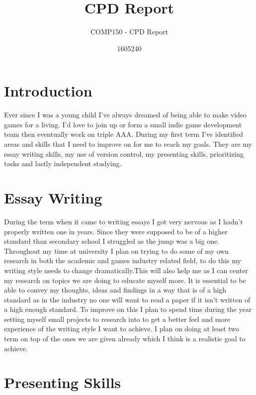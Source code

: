 \documentclass{scrartcl}
\title{CPD Report}
\subtitle{COMP150 - CPD Report}
\author{1605240}
\begin{document}
\maketitle

\section*{Introduction}
Ever since I was a young child I've always dreamed of being able to make video games for a living. I'd love to join up or form a small indie game development team then eventually work on triple AAA. During my first term I've identified areas and skills that I need to improve on for me to reach my goals. They are my essay writing skills, my use of version control, my presenting skills, prioritizing tasks and lastly independent studying.

\section{Essay Writing}
During the term when it came to writing essays I got very nervous as I hadn't properly written one in years. Since they were supposed to be of a higher standard than secondary school I struggled as the jump was a big one. Throughout my time at university I plan on trying to do some of my own research in both the academic and games industry related field, to do this my writing style needs to change dramatically.This will also help me as I can center my research on topics we are doing to educate myself more.  It is essential to be able to convey my thoughts, ideas and findings in a way that is of a high standard as in the industry no one will want to read a paper if it isn't written of a high enough standard. To improve on this I plan to spend time during the year setting myself small projects to research into to get a better feel and more experience of the writing style I want to achieve. I plan on doing at least two term on top of the ones we are given already which I think is a realistic goal to achieve.


\section{Presenting Skills}
\end{document}
